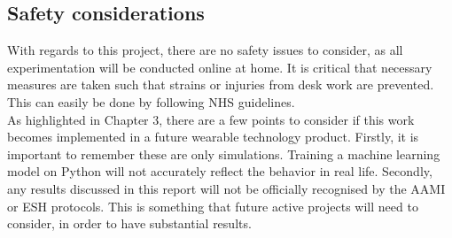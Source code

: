 \documentclass[11pt, a4paper]{article}
\begin{document}
\subsection{Safety considerations}
With regards to this project, there are no safety issues to consider, as all experimentation will be conducted online at home. It is critical that necessary measures are taken such that strains or injuries from desk work are prevented. This can easily be done by following NHS guidelines. \\ \newline \noindent 
As highlighted in Chapter 3, there are a few points to consider if this work becomes implemented in a future wearable technology product. Firstly, it is important to remember these are only simulations. Training a machine learning model on Python will not accurately reflect the behavior in real life. Secondly, any results discussed in this report will not be officially recognised by the AAMI or ESH protocols. This is something that future active projects will need to consider, in order to have substantial results.

\newpage
\end{document}
